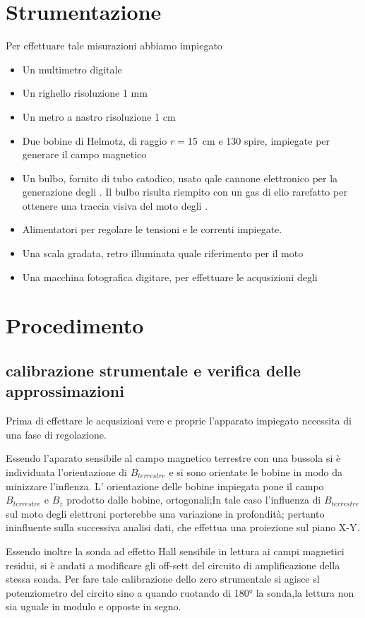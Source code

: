 \section{Strumentazione}
	Per effettuare tale misurazioni abbiamo impiegato 
	\begin{itemize}[$\cdot$]
		\item Un multimetro digitale
		\item Un righello risoluzione 1 \si{mm}
		\item Un metro a nastro risoluzione 1 \si{cm}
		\item Due bobine di Helmotz, di raggio $r=$\SI{15}{cm} e 130 spire, impiegate per generare il campo magnetico
		\item Un bulbo, fornito di tubo catodico, usato qale cannone elettronico per la 
			generazione degli \e.
			Il bulbo risulta riempito con un gas di elio rarefatto 
			per ottenere una traccia visiva del moto degli \e.
			
		\item Alimentatori per regolare le tensioni e le correnti impiegate.
		\item Una scala gradata, retro illuminata quale riferimento per il moto
		\item Una macchina fotografica digitare, per effettuare le acqusizioni degli
			\e
	\end{itemize}	
\section{Procedimento}	
	\subsection{calibrazione strumentale e verifica delle approssimazioni}	
		Prima di effettare le acqusizioni vere e proprie l'apparato impiegato necessita di una 
		fase di regolazione.
		
		Essendo l'aparato sensibile al campo magnetico terrestre
		con una bussola si è individuata l'orientazione di $B_{terrestre}$
		e si sono orientate le bobine in modo da minizzare l'inflenza.
		L' orientazione delle bobine impiegata pone il campo $B_{terrestre}$ e $B_z$
		prodotto dalle bobine, ortogonali;In tale caso l'influenza
		di $B_{terrestre}$ sul moto degli elettroni porterebbe una variazione
		in profondità; pertanto ininfluente sulla successiva analisi dati,
		che effettua una proiezione sul piano X-Y.
		
		Essendo inoltre la sonda ad effetto Hall sensibile in lettura ai
		campi magnetici residui,  si è andati a modificare gli off-sett del circuito di amplificazione della stessa sonda.
		Per fare tale calibrazione dello zero strumentale si agisce sl potenziometro del circito sino 
		a quando ruotando di \ang{180} la sonda,la lettura non sia 
		uguale in modulo e opposte in segno.
		
